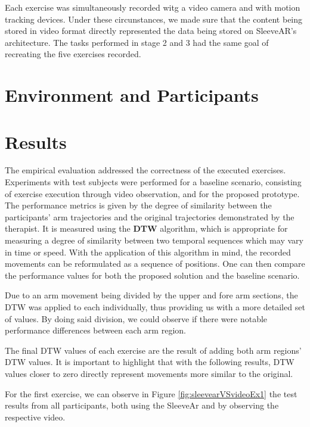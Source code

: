 Each exercise was simultaneously recorded witg a video camera and with motion tracking devices. Under these circunstances, we made sure that the content being stored in video format directly represented the data being stored on SleeveAR's architecture.
The tasks performed in stage 2 and 3 had the same goal of recreating the five exercises recorded.


\section{Environment and Participants} 



\section{Results}

The empirical evaluation addressed the correctness of the executed exercises. Experiments with test subjects were performed for a baseline scenario, consisting of exercise execution through video observation, and for the proposed prototype. The performance metrics is given by the degree of similarity between the participants' arm trajectories and the original trajectories demonstrated by the therapist. It is measured using the \textbf{\ac{DTW}}  algorithm, 
which is appropriate for measuring a degree of similarity between two temporal sequences which may vary in time or speed. With the application of this algorithm in mind, the recorded movements can be reformulated as a sequence of positions. One can then compare the performance values for both the proposed solution and the baseline scenario.

Due to an arm movement being divided by the upper and fore arm sections, the \ac{DTW} was applied to each individually, thus providing us with a more detailed set of values. By doing said division, we could observe if there were notable performance differences between each arm region.

The final \ac{DTW} values of each exercise are the result of adding both arm regions' DTW values. It is important to highlight that with the following results, DTW values closer to zero directly represent movements more similar to the original.

For the first exercise, we can observe in Figure \ref{fig:sleevearVSvideoEx1} the test results from all participants, both using the SleeveAr and by observing the respective video.

